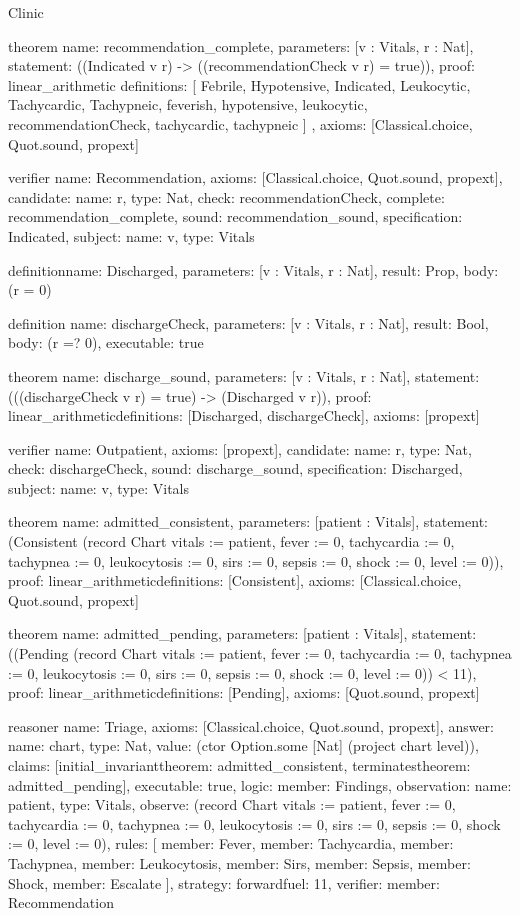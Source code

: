 \begin{lexlean}{Clinic}
\begin{semanticmodule}
theorem{
  name: recommendation_complete,
  parameters: [v : Vitals, r : Nat],
  statement: ((Indicated v r) -> ((recommendationCheck v r) = true)),
  proof: linear_arithmetic{
    definitions: [
      Febrile,
      Hypotensive,
      Indicated,
      Leukocytic,
      Tachycardic,
      Tachypneic,
      feverish,
      hypotensive,
      leukocytic,
      recommendationCheck,
      tachycardic,
      tachypneic
    ]
  },
  axioms: [Classical.choice, Quot.sound, propext]
}

verifier{
  name: Recommendation,
  axioms: [Classical.choice, Quot.sound, propext],
  candidate: {name: r, type: Nat},
  check: recommendationCheck,
  complete: recommendation_complete,
  sound: recommendation_sound,
  specification: Indicated,
  subject: {name: v, type: Vitals}
}

definition{name: Discharged, parameters: [v : Vitals, r : Nat], result: Prop, body: (r = 0)}

definition{
  name: dischargeCheck,
  parameters: [v : Vitals, r : Nat],
  result: Bool,
  body: (r =? 0),
  executable: true
}

theorem{
  name: discharge_sound,
  parameters: [v : Vitals, r : Nat],
  statement: (((dischargeCheck v r) = true) -> (Discharged v r)),
  proof: linear_arithmetic{definitions: [Discharged, dischargeCheck]},
  axioms: [propext]
}

verifier{
  name: Outpatient,
  axioms: [propext],
  candidate: {name: r, type: Nat},
  check: dischargeCheck,
  sound: discharge_sound,
  specification: Discharged,
  subject: {name: v, type: Vitals}
}

theorem{
  name: admitted_consistent,
  parameters: [patient : Vitals],
  statement: (Consistent (record Chart {vitals := patient, fever := 0, tachycardia := 0, tachypnea := 0, leukocytosis := 0, sirs := 0, sepsis := 0, shock := 0, level := 0})),
  proof: linear_arithmetic{definitions: [Consistent]},
  axioms: [Classical.choice, Quot.sound, propext]
}

theorem{
  name: admitted_pending,
  parameters: [patient : Vitals],
  statement: ((Pending (record Chart {vitals := patient, fever := 0, tachycardia := 0, tachypnea := 0, leukocytosis := 0, sirs := 0, sepsis := 0, shock := 0, level := 0})) < 11),
  proof: linear_arithmetic{definitions: [Pending]},
  axioms: [Quot.sound, propext]
}

reasoner{
  name: Triage,
  axioms: [Classical.choice, Quot.sound, propext],
  answer: {name: chart, type: Nat, value: (ctor Option.some [Nat] (project chart level))},
  claims: [initial_invariant{theorem: admitted_consistent}, terminates{theorem: admitted_pending}],
  executable: true,
  logic: {member: Findings},
  observation: {name: patient, type: Vitals},
  observe: (record Chart {vitals := patient, fever := 0, tachycardia := 0, tachypnea := 0, leukocytosis := 0, sirs := 0, sepsis := 0, shock := 0, level := 0}),
  rules: [
    {member: Fever},
    {member: Tachycardia},
    {member: Tachypnea},
    {member: Leukocytosis},
    {member: Sirs},
    {member: Sepsis},
    {member: Shock},
    {member: Escalate}
  ],
  strategy: forward{fuel: 11},
  verifier: {member: Recommendation}
}


\end{semanticmodule}
\end{lexlean}
